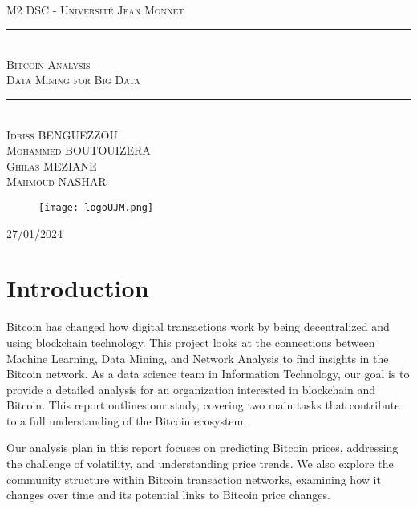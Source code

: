 \documentclass[a4paper, 12pt]{article}
\newcommand{\HRule}{\rule{\linewidth}{0.5mm}}
\begin{document}
\begin{titlepage}
  \begin{sffamily}
  \begin{center}

   
    \textsc{\LARGE }\\[2cm]

    \textsc{\Large M2 DSC - Université Jean Monnet}\\[1.5cm]

    \HRule \\[0.4cm]
    { \huge  \textsc{Bitcoin Analysis} \\
    \textsc{\Large Data Mining for Big Data}\\ [0.4cm] }
	
    \HRule \\[2cm]
    \textsc { Idriss BENGUEZZOU \\Mohammed BOUTOUIZERA \\Ghilas MEZIANE \\Mahmoud NASHAR}
 \begin{figure}
     \centering
    \texttt{[image: logoUJM.png]}
     \label{fig:ujm_logo}
 \end{figure}

    \vfill

    {\large {} 27/01/2024}

  \end{center}
  \end{sffamily}
\end{titlepage}


\newpage
\tableofcontents

\newpage

\section{Introduction}

Bitcoin has changed how digital transactions work by being decentralized and using blockchain technology. This project looks at the connections between Machine Learning, Data Mining, and Network Analysis to find insights in the Bitcoin network. As a data science team in Information Technology, our goal is to provide a detailed analysis for an organization interested in blockchain and Bitcoin. This report outlines our study, covering two main tasks that contribute to a full understanding of the Bitcoin ecosystem.

Our analysis plan in this report focuses on predicting Bitcoin prices, addressing the challenge of volatility, and understanding price trends. We also explore the community structure within Bitcoin transaction networks, examining how it changes over time and its potential links to Bitcoin price changes.
\end{document}
